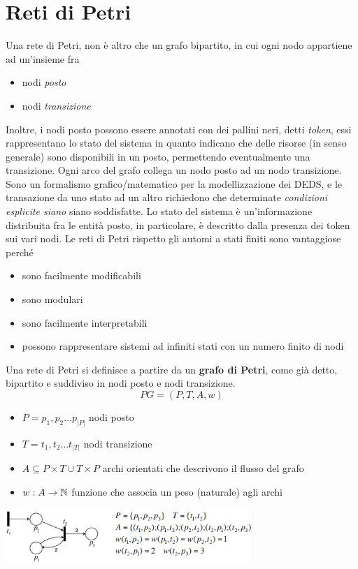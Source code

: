 \documentclass[10pt, letterpaper]{report}
\begin{document}
\section{Reti di Petri}
Una rete di Petri, non è altro che un grafo bipartito, in cui ogni nodo 
appartiene ad un'insieme fra \begin{itemize}
    \item nodi \textit{posto}
    \item nodi \textit{transizione}
\end{itemize}
Inoltre, i nodi posto possono essere annotati con dei pallini neri, detti \textit{token}, essi rappresentano 
lo stato del sistema in quanto indicano che delle risorse (in senso generale) sono disponibili in un posto, 
permettendo eventualmente una transizione. Ogni arco del grafo collega un nodo posto ad un nodo transizione.\acc 
Sono un formalismo grafico/matematico per la modellizzazione dei DEDS, e le transazione da uno stato ad un altro richiedono che determinate \textit{condizioni esplicite siano} siano soddisfatte. Lo stato del sistema è un'informazione distribuita fra le entità posto, in particolare, è descritto dalla presenza dei token sui vari nodi.\acc 
Le reti di Petri rispetto gli automi a stati finiti sono vantaggiose perché\begin{itemize}
    \item sono facilmente modificabili 
    \item sono modulari 
    \item sono facilmente interpretabili 
    \item possono rappresentare sistemi ad infiniti stati con un numero finito di nodi
\end{itemize}
Una rete di Petri si definisce a partire da un \textbf{grafo di Petri}, come già detto, bipartito e suddiviso in nodi posto e nodi transizione. $$ PG=(P,T,A,w)$$
\begin{itemize}
    \item $P={p_1,p_2\dots p_{|P|}}$ nodi posto
    \item $T={t_1,t_2\dots t_{|T|}}$ nodi transizione 
    \item $A\subseteq P\times T \cup T \times P$ archi orientati che descrivono il flusso del grafo 
    \item $w:A\rightarrow {\mathbb N}$ funzione che associa un peso (naturale) agli archi
\end{itemize}\begin{center}
    \includegraphics[width=0.7\textwidth]{images/petri.png}
\end{center}
\end{document}
